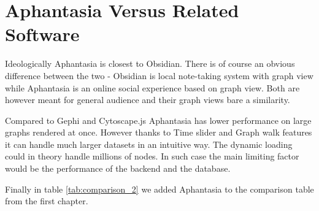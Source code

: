 \section{Aphantasia Versus Related Software}

Ideologically Aphantasia is closest to Obsidian.
There is of course an obvious difference between the two - Obsidian is local note-taking system with graph view while Aphantasia is an online social experience based on graph view.
Both are however meant for general audience and their graph views bare a similarity.

Compared to Gephi and Cytoscape.js Aphantasia has lower performance on large graphs rendered at once.
However thanks to Time slider and Graph walk features it can handle much larger datasets in an intuitive way.
The dynamic loading could in theory handle millions of nodes. In such case the main limiting factor would be the performance of the backend and the database.

Finally in table \ref{tab:comparison_2} we added Aphantasia to the comparison table from the first chapter.

